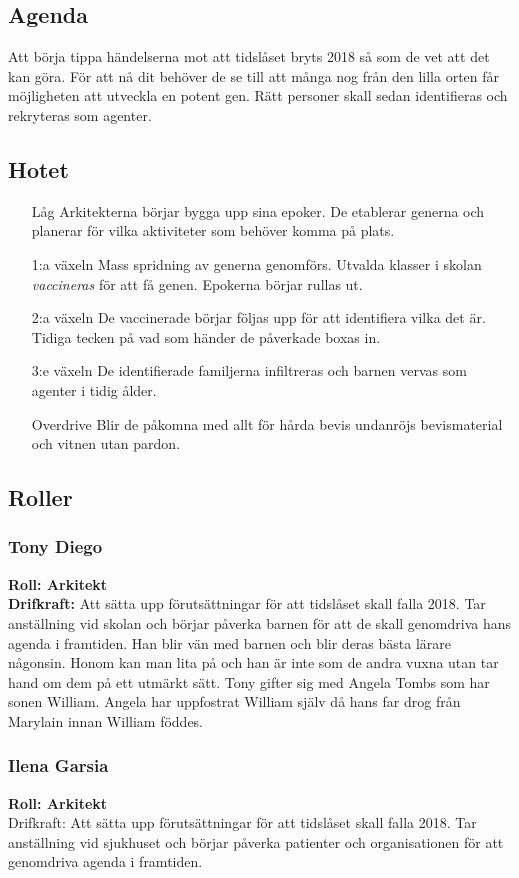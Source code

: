 \subsection{Agenda}
Att börja tippa händelserna mot att tidslåset bryts 2018 så som de vet att det kan göra. För att nå dit behöver de se till att många nog från den lilla orten får möjligheten att utveckla en potent gen. Rätt personer skall sedan identifieras och rekryteras som agenter.
\subsection{Hotet}
\begin{itemize}
  \item[Låg] Arkitekterna börjar bygga upp sina epoker. De etablerar generna och planerar för vilka aktiviteter som behöver komma på plats.
  \item[1:a växeln] Mass spridning av generna genomförs. Utvalda klasser i skolan \textit{vaccineras} för att få genen. Epokerna börjar rullas ut.
  \item[2:a växeln] De vaccinerade börjar följas upp för att identifiera vilka det är. Tidiga tecken på vad som händer de påverkade boxas in.
  \item[3:e växeln] De identifierade familjerna infiltreras och barnen vervas som agenter i tidig ålder.
  \item[Overdrive] Blir de påkomna med allt för hårda bevis undanröjs bevismaterial och vitnen utan pardon.
\end{itemize}
\subsection{Roller}
\subsubsection{Tony Diego}
\textbf{Roll: Arkitekt}\\
\textbf{Drifkraft:} Att sätta upp förutsättningar för att tidslåset skall falla 2018. Tar anställning vid skolan och börjar påverka barnen för att de skall genomdriva hans agenda i framtiden. Han blir vän med barnen och blir deras bästa lärare någonsin. Honom kan man lita på och han är inte som de andra vuxna utan tar hand om dem på ett utmärkt sätt. Tony gifter sig med Angela Tombs som har sonen William. Angela har uppfostrat William själv då hans far drog från Marylain innan William föddes.
\subsubsection{Ilena Garsia}
\textbf{Roll: Arkitekt}\\
Drifkraft: Att sätta upp förutsättningar för att tidslåset skall falla 2018. Tar anställning vid sjukhuset och börjar påverka patienter och organisationen för att genomdriva agenda i framtiden.
